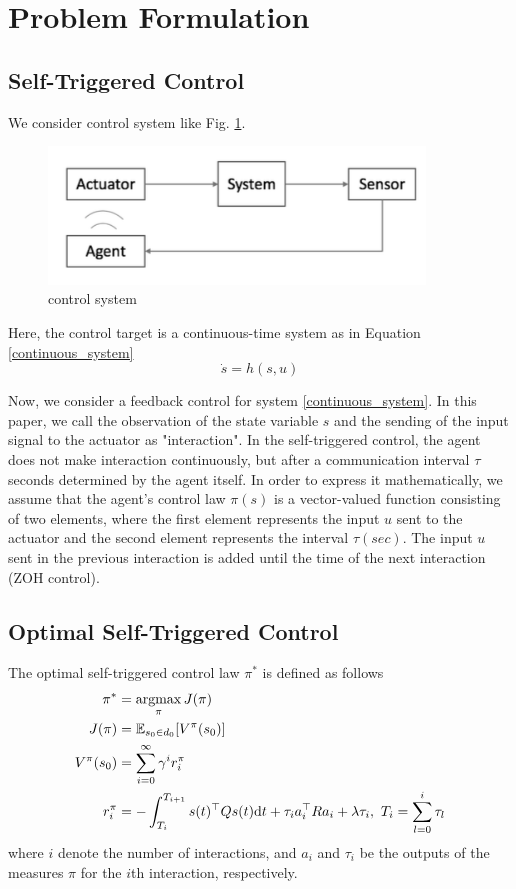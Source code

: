 \documentclass[english, dvipdfmx]{ampmt}             %
\newcommand{\argmax}{\mathop{\rm argmax}\limits}
\newcommand{\expect}{\mathbb{E}}
\begin{document}
\section{Problem Formulation}
\subsection{Self-Triggered Control}
We consider control system like Fig. \ref{image}.
\begin{figure}[h]
	\centering
 	\includegraphics[width=10cm]{event.png}
 	\caption{control system} \label{image}
\end{figure}
Here, the control target is a continuous-time system as in Equation \eqref{continuous_system}
\begin{equation}
	\dot{s} = h(s,u) \label{continuous_system}
\end{equation}\par
Now, we consider a feedback control for system \eqref{continuous_system}. In this paper, we call the observation of the state variable $s$ and the sending of the input signal to the actuator as "interaction". In the self-triggered control, the agent does not make interaction continuously, but after a communication interval $\tau$ seconds determined by the agent itself. In order to express it mathematically, we assume that the agent's control law $\pi(s)$ is a vector-valued function consisting of two elements, where the first element represents the input $u$ sent to the actuator and the second element represents the interval $\tau (sec)$. The input $u$ sent in the previous interaction is added until the time of the next interaction (ZOH control).

\subsection{Optimal Self-Triggered Control}
The optimal self-triggered control law $\pi^{*}$ is defined as follows
\begin{align}
	\pi^{*} &= \argmax_{\pi}J(\pi) \label{optimal_policy}\\
	J(\pi) &= \expect_{s_0\in d_0}[V^{\pi}(s_0)] \\
	V^{\pi}(s_0) &= \sum_{i=0}^{\infty} \gamma^i r^{\pi}_i \label{value} \\
	r^{\pi}_i &= -\int_{T_i}^{T_{i+1}}s(t)^{\top}Qs(t)\textrm{d}t +\tau_ia_i^{\top}Ra_i + \lambda \tau_i, ~T_i = \sum_{l=0}^{i} \tau_l \label{reward}
\end{align}
where $i$ denote the number of interactions, and $a_i$ and $\tau_i$ be the outputs of the measures $\pi$ for the $i$th interaction, respectively. \par
\end{document}
